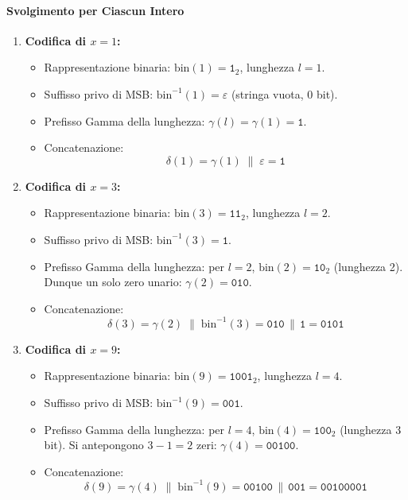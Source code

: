 \paragraph{Svolgimento per Ciascun Intero}
\begin{enumerate}
  \item \textbf{Codifica di $x = 1$:}
  \begin{itemize}
    \item Rappresentazione binaria: $\text{bin}(1) = \texttt{1}_2$, lunghezza $l = 1$.
    \item Suffisso privo di MSB: $\text{bin}^{-1}(1) = \varepsilon$ (stringa vuota, 0 bit).
    \item Prefisso Gamma della lunghezza: $\gamma(l) = \gamma(1) = \texttt{1}$.
    \item Concatenazione:
    \begin{equation*}
      \delta(1) = \gamma(1) \;\|\; \varepsilon = \texttt{1}
    \end{equation*}
  \end{itemize}

  \item \textbf{Codifica di $x = 3$:}
  \begin{itemize}
    \item Rappresentazione binaria: $\text{bin}(3) = \texttt{11}_2$, lunghezza $l = 2$.
    \item Suffisso privo di MSB: $\text{bin}^{-1}(3) = \texttt{1}$.
    \item Prefisso Gamma della lunghezza: per $l = 2$, $\text{bin}(2) = \texttt{10}_2$ (lunghezza 2). Dunque un solo zero unario: $\gamma(2) = \texttt{010}$.
    \item Concatenazione:
    \begin{equation*}
      \delta(3) = \gamma(2) \;\|\; \text{bin}^{-1}(3) = \texttt{010} \,\|\, \texttt{1} = \texttt{0101}
    \end{equation*}
  \end{itemize}

  \item \textbf{Codifica di $x = 9$:}
  \begin{itemize}
    \item Rappresentazione binaria: $\text{bin}(9) = \texttt{1001}_2$, lunghezza $l = 4$.
    \item Suffisso privo di MSB: $\text{bin}^{-1}(9) = \texttt{001}$.
    \item Prefisso Gamma della lunghezza: per $l = 4$, $\text{bin}(4) = \texttt{100}_2$ (lunghezza 3 bit). Si antepongono $3 - 1 = 2$ zeri: $\gamma(4) = \texttt{00100}$.
    \item Concatenazione:
    \begin{equation*}
      \delta(9) = \gamma(4) \;\|\; \text{bin}^{-1}(9) = \texttt{00100} \,\|\, \texttt{001} = \texttt{00100001}
    \end{equation*}
  \end{itemize}


\end{enumerate}
